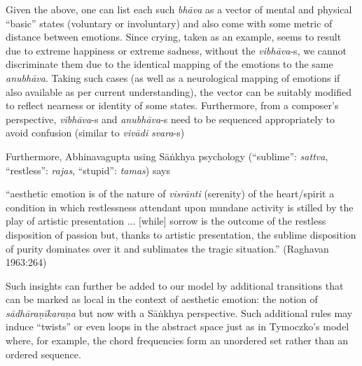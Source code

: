Given the above, one can list each such \textsl{bhāva} as a vector of mental and physical “basic” states (voluntary or involuntary) and also come with some metric of distance between emotions. Since crying, taken as an example, seems to result due to extreme happiness or extreme sadness, without the \textsl{vibhāva}-s, we cannot discriminate them due to the identical mapping of the emotions to the same \textsl{anubhāva}. Taking such cases (as well as a neurological mapping of emotions if also available as per current understanding), the vector can be suitably modified to reflect nearness or identity of some states. Furthermore, from a composer’s perspective, \textsl{vibhāva}-s and \textsl{anubhāva}-s need to be sequenced appropriately to avoid confusion (similar to \textsl{vivādi} \textsl{svara}-s)

\newpage

Furthermore, Abhinavagupta using Sāṅkhya psychology (“sublime”: \textsl{sattva}, “restless”: \textsl{rajas}, “stupid”: \textsl{tamas}) says

\begin{myquote}
“aesthetic emotion is of the nature of \textsl{visrānti} (serenity) of the heart/spirit a condition in which restlessness attendant upon mundane activity is stilled by the play of artistic presentation ... [while] sorrow is the outcome of the restless disposition of passion but, thanks to artistic presentation, the sublime disposition of purity dominates over it and sublimates the tragic situation.” 
\hfill(Raghavan 1963:264)
\end{myquote}

Such insights can further be added to our model by additional transitions that can be marked as local in the context of aesthetic emotion: the notion of \textsl{sādhāraṇīkaraṇa} but now with a Sāṅkhya perspective. Such additional rules may induce “twists” or even loops in the abstract space just as in Tymoczko’s model where, for example, the chord frequencies form an unordered set rather than an ordered sequence.

